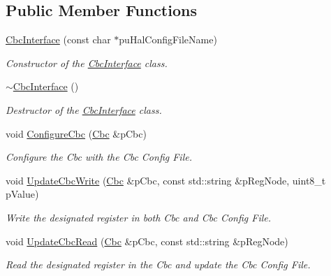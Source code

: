 \subsection*{Public Member Functions}
\begin{DoxyCompactItemize}
\item 
\hyperlink{class_ph2___hw_interface_1_1_cbc_interface_a3ddefe5549da06a7d26fee1502a792b4}{Cbc\-Interface} (const char $\ast$pu\-Hal\-Config\-File\-Name)
\begin{DoxyCompactList}\small\item\em Constructor of the \hyperlink{class_ph2___hw_interface_1_1_cbc_interface}{Cbc\-Interface} class. \end{DoxyCompactList}\item 
\hyperlink{class_ph2___hw_interface_1_1_cbc_interface_a1f0ab7d7cf7783a0fe275e8e1d7e5a49}{$\sim$\-Cbc\-Interface} ()
\begin{DoxyCompactList}\small\item\em Destructor of the \hyperlink{class_ph2___hw_interface_1_1_cbc_interface}{Cbc\-Interface} class. \end{DoxyCompactList}\item 
void \hyperlink{class_ph2___hw_interface_1_1_cbc_interface_af5cf4eb5b7134835f00349cb19f35c56}{Configure\-Cbc} (\hyperlink{class_ph2___hw_description_1_1_cbc}{Cbc} \&p\-Cbc)
\begin{DoxyCompactList}\small\item\em Configure the Cbc with the Cbc Config File. \end{DoxyCompactList}\item 
void \hyperlink{class_ph2___hw_interface_1_1_cbc_interface_ae046d10fdb494b5c8bcb831016c02738}{Update\-Cbc\-Write} (\hyperlink{class_ph2___hw_description_1_1_cbc}{Cbc} \&p\-Cbc, const std\-::string \&p\-Reg\-Node, uint8\-\_\-t p\-Value)
\begin{DoxyCompactList}\small\item\em Write the designated register in both Cbc and Cbc Config File. \end{DoxyCompactList}\item 
void \hyperlink{class_ph2___hw_interface_1_1_cbc_interface_ab08ea1de98fe120098a4f5c52e017393}{Update\-Cbc\-Read} (\hyperlink{class_ph2___hw_description_1_1_cbc}{Cbc} \&p\-Cbc, const std\-::string \&p\-Reg\-Node)
\begin{DoxyCompactList}\small\item\em Read the designated register in the Cbc and update the Cbc Config File. \end{DoxyCompactList}\item 

\end{DoxyCompactItemize}
